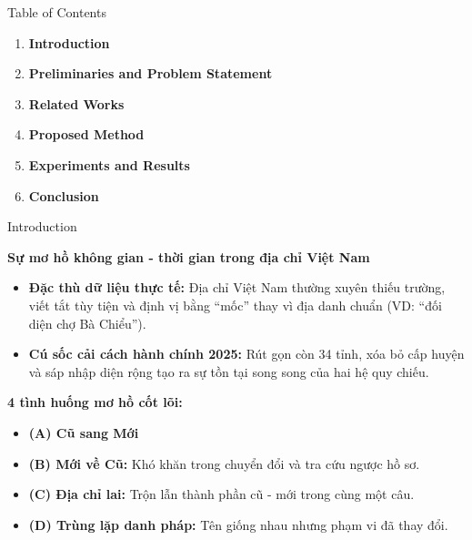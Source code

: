 \documentclass[aspectratio=169,9pt]{beamer}
\begin{document}
\begin{frame}{Table of Contents}
  \vspace{0.4cm}
  \begin{enumerate}[\bfseries 1]
    \setlength{\itemsep}{0.35cm}
    \item \textbf{\color{bkblue} Introduction}
    \item \textbf{\color{bkblue} Preliminaries and Problem Statement}
    \item \textbf{\color{bkblue} Related Works}
    \item \textbf{\color{bkblue} Proposed Method}
    \item \textbf{\color{bkblue} Experiments and Results}
    \item \textbf{\color{bkblue} Conclusion}
  \end{enumerate}
\end{frame}

\begin{frame}{Introduction}
  \vspace{0.05cm}
  \centerline{\large\textbf{Sự mơ hồ không gian - thời gian trong địa chỉ Việt Nam}}
  \vspace{0.2cm}

  \begin{itemize}
    \setlength{\itemsep}{6pt}
    \item \textbf{Đặc thù dữ liệu thực tế:} Địa chỉ Việt Nam thường xuyên thiếu trường, viết tắt tùy tiện và định vị bằng ``mốc'' thay vì địa danh chuẩn (VD: ``đối diện chợ Bà Chiểu'').
    \item \textbf{Cú sốc cải cách hành chính 2025:} Rút gọn còn 34 tỉnh, xóa bỏ cấp huyện và sáp nhập diện rộng tạo ra sự tồn tại song song của hai hệ quy chiếu.
  \end{itemize}

  \vspace{0.2cm}
  \textbf{4 tình huống mơ hồ cốt lõi:}
  \begin{itemize}
    \setlength{\itemsep}{3pt}
    \item \textbf{(A) Cũ sang Mới}
    \item \textbf{(B) Mới về Cũ:} Khó khăn trong chuyển đổi và tra cứu ngược hồ sơ.
    \item \textbf{(C) Địa chỉ lai:} Trộn lẫn thành phần cũ - mới trong cùng một câu.
    \item \textbf{(D) Trùng lặp danh pháp:} Tên giống nhau nhưng phạm vi đã thay đổi.
  \end{itemize}
\end{frame}
\end{document}
